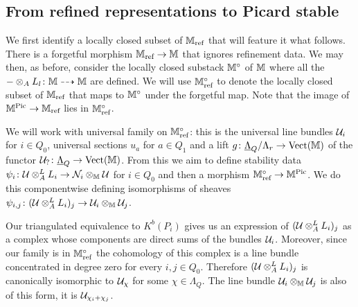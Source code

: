 \documentclass[12pt]{amsart}
\begin{document}
\subsection{From refined representations to Picard stable}

We first identify a locally closed subset of $\mathbb{M}_\text{ref}$ that will feature it what follows.
There is a forgetful morphism $\mathbb{M}_\text{ref} \rightarrow \mathbb{M}$ that ignores refinement data.
We may then, as before, consider the locally closed substack $\mathbb{M}^\circ$ of $\mathbb{M}$ where all the $-\otimes_A L_l \colon \mathbb{M} \dashrightarrow \mathbb{M}$ are defined.
We will use $\mathbb{M}_\text{ref}^\circ$ to denote the locally closed subset of $\mathbb{M}_\text{ref}$ that maps to $\mathbb{M}^\circ$ under the forgetful map.
Note that the image of $\mathbb{M}^{\operatorname{Pic}} \rightarrow \mathbb{M}_\text{ref}$ lies in $\mathbb{M}_\text{ref}^\circ$.

We will work with universal family on $\mathbb{M}_\text{ref}^\circ$: this is the universal line bundles $\mathcal{U}_i$ for $i \in Q_0$, universal sections $u_a$ for $a \in Q_1$ and a lift $g \colon \underline{\Lambda}_Q/\Lambda_r \rightarrow \operatorname{Vect}(\mathbb{M})$ of the functor $\mathcal{U}_? \colon \underline{\Lambda}_Q \rightarrow \operatorname{Vect}(\mathbb{M})$.
From this we aim to define stability data $\psi_i \colon \mathcal{U} \otimes_A^L L_i \rightarrow \mathcal{N}_i \otimes_{\mathbb{M}} \mathcal{U}$ for $i\in Q_0$ and then a morphism $\mathbb{M}_\text{ref}^\circ \rightarrow \mathbb{M}^{\operatorname{Pic}}$.
We do this componentwise defining isomorphisms of sheaves $\psi_{i,j} \colon (\mathcal{U} \otimes_A^L L_i)_j \rightarrow \mathcal{U}_i \otimes_{\mathbb{M}} \mathcal{U}_j$.

Our triangulated equivalence to $K^b(P_i)$ gives us an expression of $(\mathcal{U} \otimes_A^L L_i)_j$ as a complex whose components are direct sums of the bundles $\mathcal{U}_i$.
Moreover, since our family is in $\mathbb{M}_\text{ref}^\circ$ the cohomology of this complex is a line bundle concentrated in degree zero for every $i,j \in Q_0$.
Therefore $(\mathcal{U} \otimes_A^L L_i)_j$ is canonically isomorphic to $\mathcal{U}_{\chi}$ for some $\chi \in \Lambda_{Q}$.
The line bundle $\mathcal{U}_i \otimes_{\mathbb{M}} \mathcal{U}_j$ is also of this form, it is $\mathcal{U}_{\chi_i+\chi_j}$.
\end{document}
